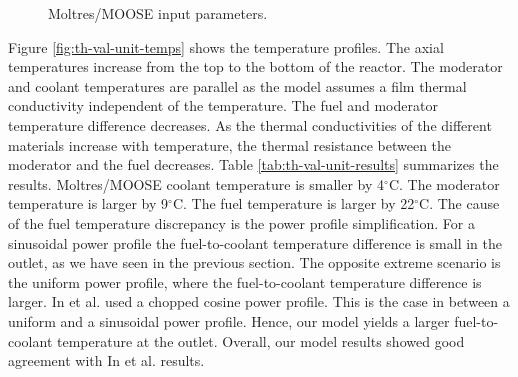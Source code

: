 \begin{figure}[htbp!]
	\centering
	\hfill
  \caption{Moltres/MOOSE input parameters.}
	\label{fig:th-val-unit-model}
\end{figure}

Figure \ref{fig:th-val-unit-temps} shows the temperature profiles.
The axial temperatures increase from the top to the bottom of the reactor.
The moderator and coolant temperatures are parallel as the model assumes a film thermal conductivity independent of the temperature.
The fuel and moderator temperature difference decreases.
As the thermal conductivities of the different materials increase with temperature, the thermal resistance between the moderator and the fuel decreases.
Table \ref{tab:th-val-unit-results} summarizes the results.
Moltres/MOOSE coolant temperature is smaller by 4$^{\circ}$C.
The moderator temperature is larger by 9$^{\circ}$C.
The fuel temperature is larger by 22$^{\circ}$C.
The cause of the fuel temperature discrepancy is the power profile simplification.
For a sinusoidal power profile the fuel-to-coolant temperature difference is small in the outlet, as we have seen in the previous section.
The opposite extreme scenario is the uniform power profile, where the fuel-to-coolant temperature difference is larger.
In et al. used a chopped cosine power profile.
This is the case in between a uniform and a sinusoidal power profile.
Hence, our model yields a larger fuel-to-coolant temperature at the outlet.
Overall, our model results showed good agreement with In et al. results.

